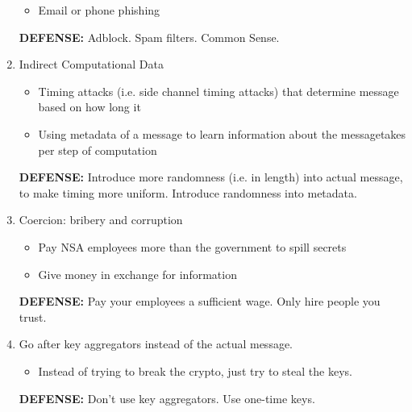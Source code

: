 \documentclass[11pt]{article}
\begin{document}
\begin{enumerate}
\begin{itemize}
	\item Email or phone phishing
	\end{itemize}
	\textbf{DEFENSE: } Adblock. Spam filters. Common Sense.
\item Indirect Computational Data
	\begin{itemize}
	\item Timing attacks (i.e. side channel timing attacks) that determine message based on how long it 
	\item Using metadata of a message to learn information about the messagetakes per step of computation
	\end{itemize}
	\textbf{DEFENSE: } Introduce more randomness (i.e. in length) into actual message, to make timing more uniform. Introduce randomness into metadata.
\item Coercion: bribery and corruption
	\begin{itemize}
	\item Pay NSA employees more than the government to spill secrets
	\item Give money in exchange for information
	\end{itemize}
	\textbf{DEFENSE: } Pay your employees a sufficient wage. Only hire people you trust.
\item Go after key aggregators instead of the actual message.
	\begin{itemize}
	\item Instead of trying to break the crypto, just try to steal the keys.
	\end{itemize}
	\textbf{DEFENSE: } Don't use key aggregators. Use one-time keys.

\end{enumerate}
\end{document}
